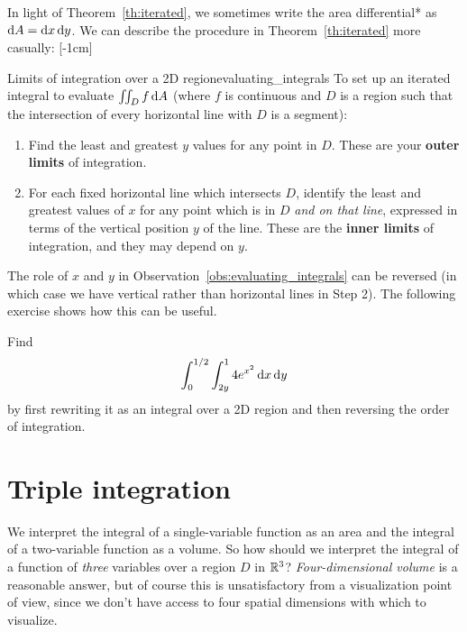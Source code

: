\documentclass[svgnames]{watsonbook}
\begin{document}
In light of
Theorem~\ref{th:iterated}, we sometimes write the area differential*
as $\mathrm{d} A = \mathrm{d} x \, \mathrm{d} y$. We can describe the procedure in
Theorem~\ref{th:iterated} more casually: [-1cm]
\begin{obs}{Limits of integration over a 2D
    region}{evaluating_integrals}
      To set up an iterated integral to evaluate $\iint_D f \, {\mathrm{d}}A$ (where $f$ is continuous and $D$ is a
    region such that the intersection of every horizontal line with
    $D$ is a segment): 
  \begin{enumerate}
\item Find the least and greatest $y$ values for any point in
  $D$. These are your \textbf{outer limits} of integration. 
\item For each fixed horizontal line which intersects $D$, identify
  the least and greatest values of $x$ for any point which is in $D$
  \textit{and on that line}, expressed in terms of the vertical
  position $y$ of the line. These are the \textbf{inner limits} of
  integration, and they may depend on $y$.
\end{enumerate}
\end{obs}

The role of $x$ and $y$ in Observation~\ref{obs:evaluating_integrals} can
be reversed (in which case we have vertical rather than horizontal
lines in Step 2). The following exercise shows how this can be useful. 

\begin{exercise}{}{}
  Find
  \[
    \int_0^{1/2} \int_{2y}^1 4e^{x^2}\, \mathrm{d} x\, \mathrm{d} y
  \]
  by first rewriting it as an integral over a 2D
  region and then reversing the order of integration.
\end{exercise}


\section{Triple integration} \label{sec:triple} 


We interpret the integral of a single-variable function as an area and
the integral of a two-variable function as a volume. So how should we
interpret the integral of a function of \textit{three} variables over
a region $D$ in $\mathbb{R}^3$?  \textit{Four-dimensional volume} is a reasonable
answer, but of course this is unsatisfactory from a visualization
point of view, since we don't have access to four spatial dimensions
with which to visualize.
\end{document}
